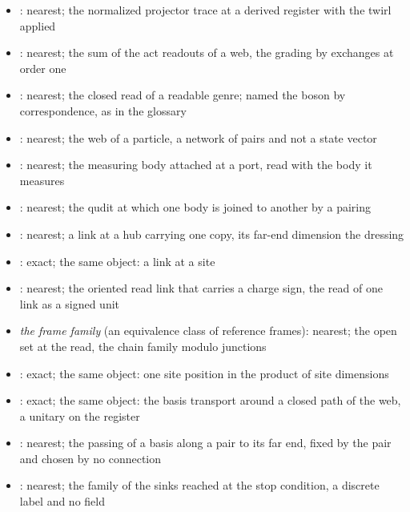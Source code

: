 \begin{chtheorem}
\begin{itemize}
\item {}: nearest; the normalized projector trace at a derived register with the twirl applied
\item {}: nearest; the sum of the act readouts of a web, the grading by exchanges at order one
\item {}: nearest; the closed read of a readable genre; named the boson by correspondence, as in the glossary
\item {}: nearest; the web of a particle, a network of pairs and not a state vector
\item {}: nearest; the measuring body attached at a port, read with the body it measures
\item {}: nearest; the qudit at which one body is joined to another by a pairing
\item {}: nearest; a link at a hub carrying one copy, its far-end dimension the dressing
\item {}: exact; the same object: a link at a site
\item {}: nearest; the oriented read link that carries a charge sign, the read of one link as a signed unit
\item \emph{the frame family} (an equivalence class of reference frames): nearest; the open set at the read, the chain family modulo junctions
\item {}: exact; the same object: one site position in the product of site dimensions
\item {}: exact; the same object: the basis transport around a closed path of the web, a unitary on the register
\item {}: nearest; the passing of a basis along a pair to its far end, fixed by the pair and chosen by no connection
\item {}: nearest; the family of the sinks reached at the stop condition, a discrete label and no field

\end{itemize}
\end{chtheorem}
